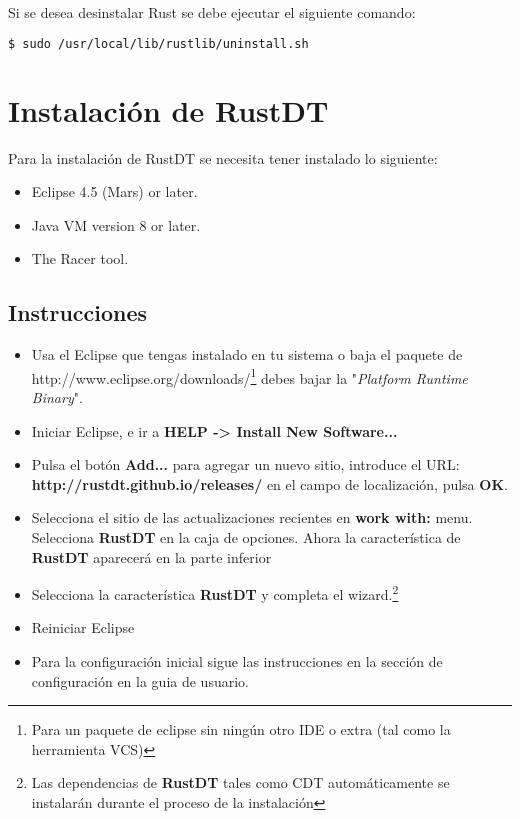 \documentclass[12pt, twoside]{report}
\begin{document}
Si se desea desinstalar Rust se debe ejecutar el siguiente comando:

\begin{lstlisting}[language=bash]
$ sudo /usr/local/lib/rustlib/uninstall.sh
\end{lstlisting}

\section{Instalación de RustDT}

Para la instalación de RustDT se necesita tener instalado lo siguiente:

\begin{itemize}

 \item Eclipse 4.5 (Mars) or later.
 \item Java VM version 8 or later.
 \item The Racer tool.

\end{itemize}

\subsection{Instrucciones}
\begin{itemize}
\item Usa el Eclipse que tengas instalado en tu sistema o baja el paquete de http://www.eclipse.org/downloads/\footnote{Para un paquete de eclipse sin ningún otro IDE o extra (tal como la herramienta VCS)} debes bajar la "\textit{Platform Runtime Binary}".

\item Iniciar Eclipse, e ir a \textbf{HELP -> Install New Software...}

\item Pulsa el botón \textbf{Add...} para agregar un nuevo sitio, introduce el URL: \textbf{http://rustdt.github.io/releases/} en el campo de localización, pulsa \textbf{OK}.

\item Selecciona el sitio de las actualizaciones recientes en \textbf{work with:} menu. Selecciona \textbf{RustDT} en la caja de opciones. Ahora la característica de \textbf{RustDT} aparecerá en la parte inferior

\item Selecciona la característica \textbf{RustDT} y completa el wizard.\footnote{Las dependencias de \textbf{RustDT} tales como CDT automáticamente  se instalarán durante el proceso de la instalación }

\item Reiniciar Eclipse  

\item Para la configuración inicial sigue las instrucciones en la sección de configuración en la guia de usuario. 

\end{itemize}
\end{document}
